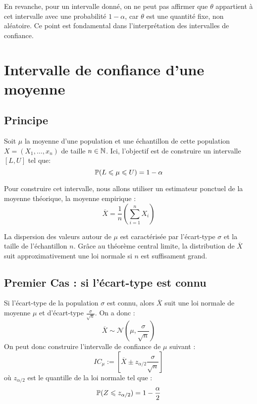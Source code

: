 \vspace{0.3cm}

En revanche, pour un intervalle donné, on ne peut pas affirmer que $\theta$ appartient à cet 
intervalle avec une probabilité $1 - \alpha$, car $\theta$ est une quantité fixe, non aléatoire. 
Ce point est fondamental dans l’interprétation des intervalles de confiance.



\section{Intervalle de confiance d'une moyenne}

\subsection{Principe}

Soit $\mu$ la moyenne d'une population et une échantillon de cette population $X = (X_1, \dots, x_n)$ de 
taille $n \in \mathbb{N}$. 
Ici, l'objectif est de construire un intervalle $[L,U]$ tel que: 
    \[ \mathbb{P}(L \leqslant \mu \leqslant U) = 1 - \alpha \] 

Pour construire cet intervalle, nous allons utiliser un estimateur ponctuel 
de la moyenne théorique, la moyenne empirique :
    \[ \overline{X} = \frac{1}{n} \left( \sum_{i=1}^{n} X_i \right) \] 

La dispersion des valeurs autour de $\mu$ est caractérisée par l'écart-type $\sigma$ et la taille de l'échantillon $n$. 
Grâce au théorème central limite, la distribution de $\overline{X}$ suit approximativement une loi normale si $n$ est 
suffisament grand. 

\subsection{Premier Cas : si l'écart-type est connu}

Si l'écart-type de la population $\sigma$ est connu, alors $\overline{X}$ suit une loi normale de moyenne $\mu$ et 
d'écart-type $\frac{\sigma}{\sqrt{n}}$. On a donc : 
    \[ \overline{X} \sim \mathcal{N}\left(\mu, \frac{\sigma}{\sqrt{n}}\right) \] 
On peut donc construire l'intervalle de confiance de $\mu$ suivant : 
    \[ \boxed{IC_\mu := \left[ \overline{X} \pm z_{\alpha/2} \frac{\sigma}{\sqrt{n}}\right]} \] 
où $ z_{\alpha/2}$ est le quantille de la loi normale tel que :
    \[ \mathbb{P}(Z \leqslant z_{\alpha/2}) = 1 - \frac{\alpha}{2} \] 

